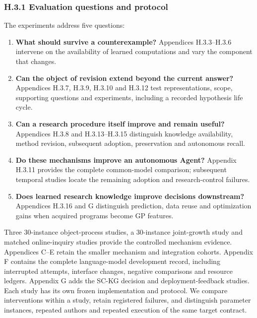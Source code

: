 \documentclass[twoside,11pt]{article}
\begin{document}
\subsubsection*{H.3.1 Evaluation questions and protocol}

The experiments address five questions:


\begin{enumerate}

\item 
\textbf{What should survive a counterexample?} Appendices H.3.3–H.3.6 intervene on the
availability of learned computations and vary the component that changes.


\item 
\textbf{Can the object of revision extend beyond the current answer?} Appendices
H.3.7, H.3.9, H.3.10 and H.3.12 test representations, scope, supporting questions and
experiments, including a recorded hypothesis life cycle.


\item 
\textbf{Can a research procedure itself improve and remain useful?} Appendices
H.3.8 and H.3.13–H.3.15 distinguish knowledge availability, method revision,
subsequent adoption, preservation and autonomous recall.


\item 
\textbf{Do these mechanisms improve an autonomous Agent?} Appendix H.3.11 provides the
complete common-model comparison; subsequent temporal studies locate the
remaining adoption and research-control failures.


\item 
\textbf{Does learned research knowledge improve decisions downstream?} Appendices
H.3.16 and G distinguish prediction, data reuse and optimization gains
when acquired programs become GP features.


\end{enumerate}

Three 30-instance object-process studies, a 30-instance joint-growth study and
matched online-inquiry studies provide the controlled mechanism evidence.
Appendices C–E retain the smaller mechanism and integration cohorts. Appendix F
contains the complete language-model development record, including interrupted
attempts, interface changes, negative comparisons and resource ledgers. Appendix G
adds the SC-KG decision and deployment-feedback studies. Each study has its own
frozen implementation and protocol. We compare interventions
within a study, retain registered failures, and distinguish parameter instances,
repeated authors and repeated execution of the same target contract.
\end{document}
